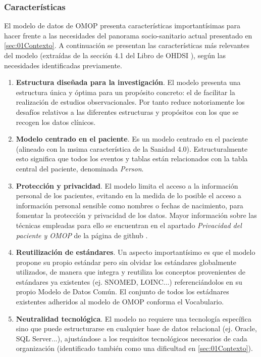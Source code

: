 \subsubsection{Características}

El modelo de datos de OMOP presenta características importantísimas para hacer frente a las necesidades del panorama socio-sanitario actual presentado en \ref{sec:01Contexto}. A continuación se presentan las características más relevantes del modelo (extraídas de la sección  4.1 del Libro de OHDSI \cite{OHDSIbook}), según las necesidades identificadas previamente.

\begin{enumerate}[label=\alph*.]
    \item \textbf{Estructura diseñada para la investigación}. 
    El modelo presenta una estructura única y óptima para un propósito concreto: el de facilitar la realización de estudios observacionales. Por tanto reduce notoriamente los desafíos relativos a las diferentes estructuras y propósitos con los que se recogen los datos clínicos.
    \item \textbf{Modelo centrado en el paciente}. Es un modelo centrado en el paciente (alineado con la msima característica de la Sanidad 4.0). Estructuralmente esto significa que todos los eventos y tablas están relacionados con la tabla central del paciente, denominada \textit{Person}. 
    \item \textbf{Protección y privacidad}. El modelo limita el acceso a la información personal de los pacientes, evitando en la medida de lo posible el acceso a información personal sensible como nombres o fechas de nacimiento, para fomentar la protección y privacidad de los datos. Mayor información sobre las técnicas empleadas para ello se encuentran en el apartado \textit{Privacidad del paciente y OMOP} de la página de github \cite{gitPagesCMD}.
    \item \textbf{Reutilización de estándares}. Un aspecto importantísimo es que el modelo propone su propio estándar pero sin olvidar los estándares globalmente utilizados, de manera que integra y reutiliza los conceptos provenientes de estándares ya existentes (ej. SNOMED, LOINC...) referenciándolos en su propio Modelo de Datos Común. El conjunto de todos los estádnares existentes adheridos al modelo de OMOP conforma el Vocabulario.
    \item \textbf{Neutralidad tecnológica}. El modelo no requiere una tecnología específica sino que puede estructurarse en cualquier base de datos relacional (ej. Oracle, SQL Server...), ajustándose a los requisitos tecnológicos necesarios de cada organización (identificado también como una dificultad en \ref{sec:01Contexto}).
    
\end{enumerate}

